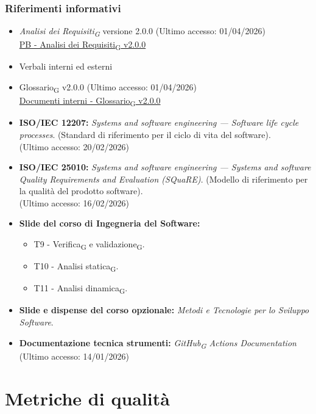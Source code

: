 \documentclass[11pt,a4paper]{article}
\newcommand{\gls}[1]{#1\textsubscript{G}}
\begin{document}
\subsubsection{Riferimenti informativi}
\begin{itemize}
\item \textit{\gls{Analisi dei Requisiti}} versione 2.0.0 (Ultimo accesso: 01/04/2026)\\
    \href{https://byteme25.github.io/ByteMe/}{PB - \gls{Analisi dei Requisiti} v2.0.0}
    \item Verbali interni ed esterni
    \item \gls{Glossario} v2.0.0 (Ultimo accesso: 01/04/2026)\\
    \href{https://byteme25.github.io/ByteMe/files.html}{Documenti interni - \gls{Glossario} v2.0.0}
    
    \item \textbf{ISO/IEC 12207:} \textit{Systems and software engineering — Software life cycle processes}. (Standard di riferimento per il ciclo di vita del software).\\ (Ultimo accesso: 20/02/2026)
    \item \textbf{ISO/IEC 25010:} \textit{Systems and software engineering — Systems and software Quality Requirements and Evaluation (SQuaRE)}. (Modello di riferimento per la qualità del prodotto software).\\ (Ultimo accesso: 16/02/2026)
    \item \textbf{Slide del corso di Ingegneria del Software:}
    \begin{itemize}
        \item T9 - \gls{Verifica} e \gls{validazione}.
        \item T10 - \gls{Analisi statica}.
        \item T11 - \gls{Analisi dinamica}.
    \end{itemize}
    \item \textbf{Slide e dispense del corso opzionale:} \textit{Metodi e Tecnologie per lo Sviluppo Software}.
    \item \textbf{Documentazione tecnica strumenti:} \textit{\gls{GitHub} Actions Documentation} (Ultimo accesso: 14/01/2026)
\end{itemize}

\newpage

\section{Metriche di qualità}
\end{document}
